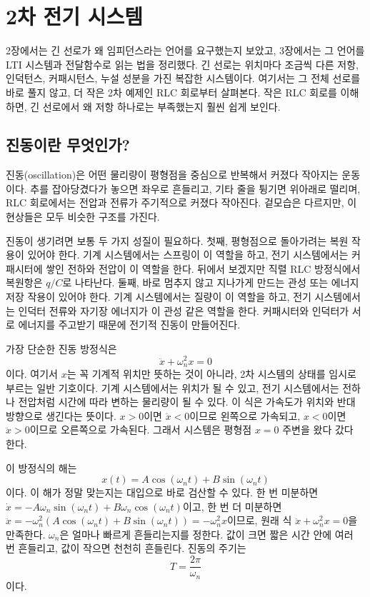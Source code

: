 \section{2차 전기 시스템}

2장에서는 긴 선로가 왜 임피던스라는 언어를 요구했는지 보았고, 3장에서는 그 언어를 LTI 시스템과 전달함수로 읽는 법을 정리했다.
긴 선로는 위치마다 조금씩 다른 저항, 인덕턴스, 커패시턴스, 누설 성분을 가진 복잡한 시스템이다.
여기서는 그 전체 선로를 바로 풀지 않고, 더 작은 2차 예제인 RLC 회로부터 살펴본다.
작은 RLC 회로를 이해하면, 긴 선로에서 왜 저항 하나로는 부족했는지 훨씬 쉽게 보인다.

\subsection{진동이란 무엇인가?}

진동(oscillation)은 어떤 물리량이 평형점을 중심으로 반복해서 커졌다 작아지는 운동이다.
추를 잡아당겼다가 놓으면 좌우로 흔들리고, 기타 줄을 튕기면 위아래로 떨리며, RLC 회로에서는 전압과 전류가 주기적으로 커졌다 작아진다.
겉모습은 다르지만, 이 현상들은 모두 비슷한 구조를 가진다.

진동이 생기려면 보통 두 가지 성질이 필요하다.
첫째, 평형점으로 돌아가려는 복원 작용이 있어야 한다.
기계 시스템에서는 스프링이 이 역할을 하고, 전기 시스템에서는 커패시터에 쌓인 전하와 전압이 이 역할을 한다.
뒤에서 보겠지만 직렬 RLC 방정식에서 복원항은 $q/C$로 나타난다.
둘째, 바로 멈추지 않고 지나가게 만드는 관성 또는 에너지 저장 작용이 있어야 한다.
기계 시스템에서는 질량이 이 역할을 하고, 전기 시스템에서는 인덕터 전류와 자기장 에너지가 이 관성 같은 역할을 한다.
커패시터와 인덕터가 서로 에너지를 주고받기 때문에 전기적 진동이 만들어진다.

가장 단순한 진동 방정식은
\begin{equation}
  \ddot{x}+\omega_n^2 x=0
\end{equation}
이다.
여기서 $x$는 꼭 기계적 위치만 뜻하는 것이 아니라, 2차 시스템의 상태를 임시로 부르는 일반 기호이다.
기계 시스템에서는 위치가 될 수 있고, 전기 시스템에서는 전하나 전압처럼 시간에 따라 변하는 물리량이 될 수 있다.
이 식은 가속도가 위치와 반대 방향으로 생긴다는 뜻이다.
$x>0$이면 $\ddot{x}<0$이므로 왼쪽으로 가속되고, $x<0$이면 $\ddot{x}>0$이므로 오른쪽으로 가속된다.
그래서 시스템은 평형점 $x=0$ 주변을 왔다 갔다 한다.

이 방정식의 해는
\begin{equation}
  x(t)=A\cos(\omega_n t)+B\sin(\omega_n t)
\end{equation}
이다.
이 해가 정말 맞는지는 대입으로 바로 검산할 수 있다.
한 번 미분하면 $\dot{x}=-A\omega_n\sin(\omega_n t)+B\omega_n\cos(\omega_n t)$이고, 한 번 더 미분하면 $\ddot{x}=-\omega_n^2\left(A\cos(\omega_n t)+B\sin(\omega_n t)\right)=-\omega_n^2 x$이므로, 원래 식 $\ddot{x}+\omega_n^2x=0$을 만족한다.
%
$\omega_n$은 얼마나 빠르게 흔들리는지를 정한다.
값이 크면 짧은 시간 안에 여러 번 흔들리고, 값이 작으면 천천히 흔들린다.
진동의 주기는
\begin{equation}
  T=\frac{2\pi}{\omega_n}
\end{equation}
이다.

